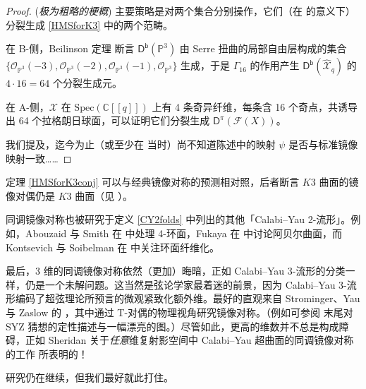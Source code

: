 \begin{proof}(\textit{极为粗略的梗概})
主要策略是对两个集合分别操作，它们（在 \cite[定义 4.15]{[Imp21]} 的意义下）分裂生成 \eqref{HMSforK3} 中的两个范畴。

在 B-侧，Beilinson 定理 \cite[定理 4.72]{[ABC+09]} 断言 $\mathsf{D^b}(\mathbb{P}^3)$ 由 Serre 扭曲的局部自由层构成的集合 $\{\mathcal{O}_{\mathbb{P}^3}(-3),\mathcal{O}_{\mathbb{P}^3}(-2),\mathcal{O}_{\mathbb{P}^3}(-1),\mathcal{O}_{\mathbb{P}^3}\}$ 生成，于是 $\Gamma_{16}$ 的作用产生 $\mathsf{D^b}(\widehat{\mathcal{X}}_q)$ 的 $4\cdot 16=64$ 个分裂生成元。

在 A-侧，$\mathcal{X}$ 在 $\text{Spec}(\mathbb{C}[[q]])$ 上有 4 条奇异纤维，每条含 16 个奇点，共诱导出 64 个拉格朗日球面，可以证明它们分裂生成 $\mathsf{D^\pi}(\mathscr{F}(X))$。

我们提及，迄今为止（或至少在 \cite{[Sei13]} 当时）尚不知道陈述中的映射 $\psi$ 是否与标准镜像映射一致…… 
\end{proof}


\begin{Rem}
定理 \ref{HMSforK3conj} 可以与经典镜像对称的预测相对照，后者断言 $K3$ 曲面的镜像对偶仍是 $K3$ 曲面（见 \cite[例 7.10]{[Imp21]}）。
\end{Rem}

同调镜像对称也被研究于定义 \ref{CY2folds} 中列出的其他「Calabi--Yau 2-流形」。例如，Abouzaid 与 Smith 在 \cite{[AS09]} 中处理 4-环面，Fukaya 在 \cite{[Fuk00]} 中讨论阿贝尔曲面，而 Kontsevich 与 Soibelman 在 \cite{[KS01]} 中关注环面纤维化。 

最后，3 维的同调镜像对称依然（更加）晦暗，正如 Calabi--Yau 3-流形的分类一样，仍是一个未解问题。这当然是弦论学家最着迷的前景，因为 Calabi--Yau 3-流形编码了超弦理论所预言的微观紧致化额外维。最好的直观来自 Strominger、Yau 与 Zaslow 的 \cite{[SYZ96]}，其中通过 T-对偶的物理视角研究镜像对称。（例如可参阅 \cite[第 7.3 节]{[Imp21]} 末尾对 SYZ 猜想的定性描述与一幅漂亮的图。）尽管如此，更高的维数并不总是构成障碍，正如 Sheridan 关于\textit{任意}维复射影空间中 Calabi--Yau 超曲面的同调镜像对称的工作 \cite{[She14]} 所表明的！   

研究仍在继续，但我们最好就此打住。  


\newpage
\thispagestyle{plain}


